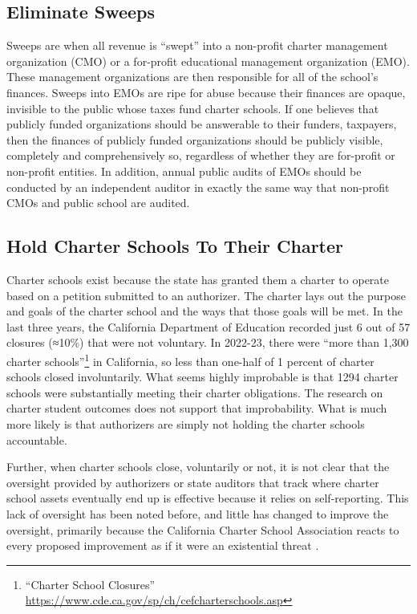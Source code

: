 \subsection{Eliminate Sweeps}%
\label{sec:eliminate-sweeps}

Sweeps are when all revenue is ``swept'' into a non-profit charter management organization (CMO) or a for-profit educational management organization (EMO). These management organizations are then responsible for all of the school's finances. Sweeps into EMOs are ripe for abuse because their finances are opaque, invisible to the public whose taxes fund charter schools. If one believes that publicly funded organizations should be answerable to their funders, taxpayers, then the finances of publicly funded organizations should be publicly visible, completely and comprehensively so, regardless of whether they are for-profit or non-profit entities. In addition, annual public audits of EMOs should be conducted by an independent auditor in exactly the same way that non-profit CMOs and public school are audited.

\subsection{Hold Charter Schools To Their Charter}%
\label{sec:hold-charter-schools}

Charter schools exist because the state has granted them a charter to operate based on a petition submitted to an authorizer. The charter lays out the purpose and goals of the charter school and the ways that those goals will be met. In the last three years, the California Department of Education  recorded just 6 out of 57 closures (≈10\%) that were not voluntary. In 2022-23, there were ``more than 1,300 charter schools''\footnote{``Charter School Closures'' \url{https://www.cde.ca.gov/sp/ch/cefcharterschools.asp}} in California, so less than one-half of 1 percent of charter schools closed involuntarily. What seems highly improbable is that 1294 charter schools were substantially meeting their charter obligations. The research on charter student outcomes does not support that improbability. What is much more likely is that authorizers are simply not holding the charter schools accountable.

Further, when charter schools close, voluntarily or not, it is not clear that the oversight provided by authorizers or state auditors that track where charter school assets eventually end up is effective because it relies on self-reporting. This lack of oversight has been noted before, and little has changed to improve the oversight, primarily because the California Charter School Association reacts to every proposed improvement as if it were an existential threat \parencite{Taketa2021a, ODonnell.etal2021}.

